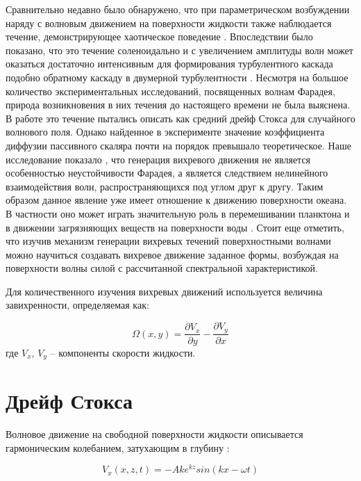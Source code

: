 Сравнительно недавно было обнаружено, что при параметрическом возбуждении наряду с волновым движением на поверхности жидкости также наблюдается течение, демонстрирующее хаотическое поведение \cite{Ramshankar1990}. Впоследствии было показано, что это течение соленоидально и с увеличением амплитуды волн может оказаться достаточно интенсивным для формирования турбулентного каскада \cite{VonKameke2011, Francois2014, Francois2013} подобно обратному каскаду в двумерной турбулентности \cite{Kraichnan1967}. Несмотря на большое количество экспериментальных исследований, посвященных волнам Фарадея, природа возникновения в них течения до настоящего времени не была выяснена. В работе \cite{Mesquita1992} это течение пытались описать как средний дрейф Стокса \cite{Stokes1847} для случайного волнового поля. Однако найденное в эксперименте значение коэффициента диффузии пассивного скаляра почти на порядок превышало теоретическое.	
	Наше исследование показало \cite{F5}, что генерация вихревого движения не является особенностью неустойчивости Фарадея, а является следствием нелинейного взаимодействия волн, распространяющихся под углом друг к другу. Таким образом данное явление уже имеет отношение к движению поверхности океана. В частности оно может играть значительную роль в перемешивании планктона и в движении загрязняющих веществ на поверхности воды \cite{Falkovich2009}.
	Стоит еще отметить, что изучив механизм генерации вихревых течений поверхностными волнами можно научиться создавать вихревое движение заданное формы, возбуждая на поверхности волны силой с рассчитанной спектральной характеристикой.
	
Для количественного изучения вихревых движений используется величина завихренности, определяемая как:

\begin{equation}
 \label{eq:defVort}
\Omega(x, y) = \frac{\partial V_x}{\partial y} - \frac{\partial V_y}{\partial x}
\end{equation}
где $V_x$, $V_y$ – компоненты скорости жидкости. 

\section{Дрейф Стокса} \label{p1_Stockes}

Волновое движение на свободной поверхности жидкости описывается гармоническим колебанием, затухающим в глубину \cite{land}:

\begin{equation}
 \label{eq:waveSimple}
 V_x(x,z,t) = -A k e^{kz}sin(kx-\omega t)
\end{equation}

